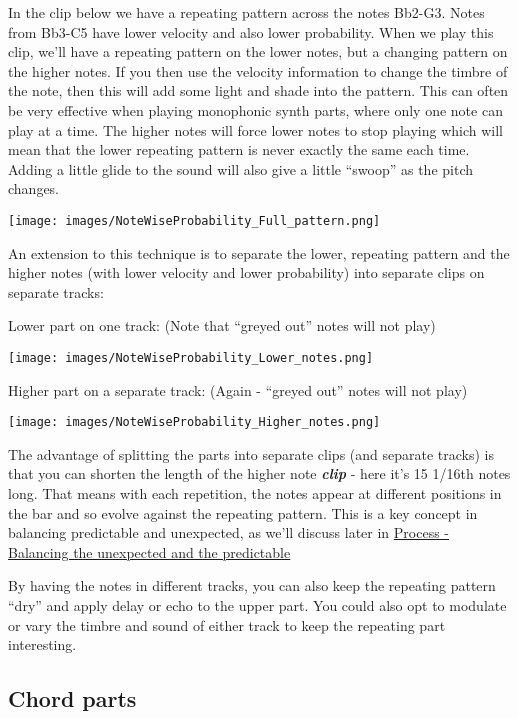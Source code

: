 \documentclass[
  12pt,
  letterpaper,
  oneside,
  open=any]{scrbook}
\begin{document}
In the clip below we have a repeating pattern across the notes Bb2-G3.
Notes from Bb3-C5 have lower velocity and also lower probability. When
we play this clip, we'll have a repeating pattern on the lower notes,
but a changing pattern on the higher notes. If you then use the velocity
information to change the timbre of the note, then this will add some
light and shade into the pattern. This can often be very effective when
playing monophonic synth parts, where only one note can play at a time.
The higher notes will force lower notes to stop playing which will mean
that the lower repeating pattern is never exactly the same each time.
Adding a little glide to the sound will also give a little ``swoop'' as
the pitch changes.

\texttt{[image: images/NoteWiseProbability\_Full\_pattern.png]}

An extension to this technique is to separate the lower, repeating
pattern and the higher notes (with lower velocity and lower probability)
into separate clips on separate tracks:

Lower part on one track: (Note that ``greyed out'' notes will not play)

\texttt{[image: images/NoteWiseProbability\_Lower\_notes.png]}

Higher part on a separate track: (Again - ``greyed out'' notes will not
play)

\texttt{[image: images/NoteWiseProbability\_Higher\_notes.png]}

The advantage of splitting the parts into separate clips (and separate
tracks) is that you can shorten the length of the higher note
\textbf{\emph{clip}} - here it's 15 1/16th notes long. That means with
each repetition, the notes appear at different positions in the bar and
so evolve against the repeating pattern. This is a key concept in
balancing predictable and unexpected, as we'll discuss later in
\hyperref[Chapter-009-Process-Balance_unexpected_and_predictable]{Process
- Balancing the unexpected and the predictable}

By having the notes in different tracks, you can also keep the repeating
pattern ``dry'' and apply delay or echo to the upper part. You could
also opt to modulate or vary the timbre and sound of either track to
keep the repeating part interesting.

\subsection{Chord parts}\label{chord-parts}
\end{document}
